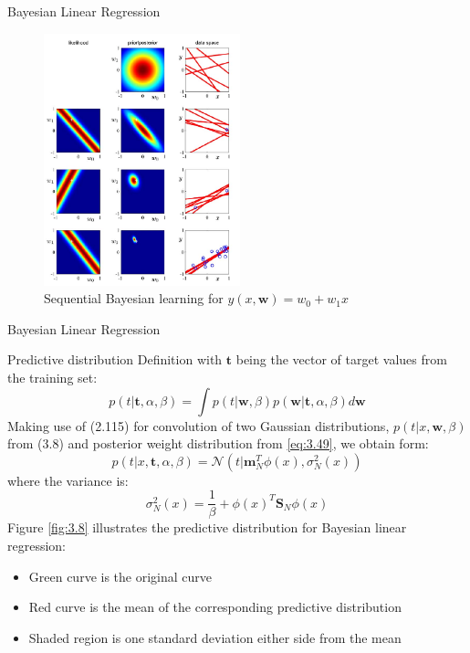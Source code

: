 \documentclass[9pt]{beamer}
\begin{document}
\begin{frame}{Bayesian Linear Regression}
    \begin{figure}[H]
            \includegraphics[width=5.7cm]{../images/Bishop_MachineLearning_Figure3-7.png} %
        \caption{Sequential Bayesian learning for $y(x, \mathbf{w}) = w_0 + w_1 x$}
        \label{fig:3.7}
    \end{figure}
\end{frame}

\begin{frame}{Bayesian Linear Regression}
    \begin{alertblock}{Predictive distribution}
        Definition with $\mathbf{t}$ being the vector of target values from the training set:
        \[ p(t|\mathbf{t}, \alpha, \beta) = \int p(t|\mathbf{w}, \beta) p(\mathbf{w}|\mathbf{t}, \alpha, \beta) d\mathbf{w} \tag{3.57} \label{eq:3.57} \]
        Making use of (2.115) for convolution of two Gaussian distributions, $p(t|x, \mathbf{w}, \beta)$ from (3.8) and posterior weight distribution from \eqref{eq:3.49}, we obtain form:
        \[ p(t|x, \mathbf{t}, \alpha, \beta) = \mathcal{N}(t|\mathbf{m}_N^T\phi(x), \sigma^2_N(x) \tag{3.58} \label{eq:3.58}) \]
        where the variance is:
        \[ \sigma^2_N(x) = \frac{1}{\beta} + \phi(x)^T \mathbf{S}_N \phi(x) \]
        Figure \ref{fig:3.8} illustrates the predictive distribution for Bayesian linear regression:
        \begin{itemize}
            \item Green curve is the original curve
            \item Red curve is the mean of the corresponding predictive distribution
            \item Shaded region is one standard deviation either side from the mean
        \end{itemize}
    \end{alertblock}
\end{frame}
\end{document}

